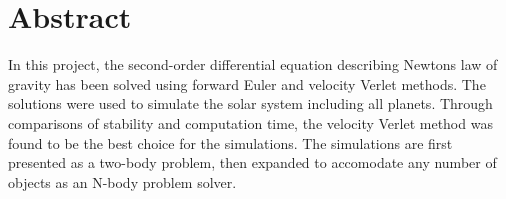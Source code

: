 \section{Abstract}
In this project, the second-order differential equation describing Newtons law of gravity has been
solved using forward Euler and velocity Verlet methods. The solutions were used to simulate the
solar system including all planets. Through comparisons of stability and computation time,
the velocity Verlet method was found to be the best choice for the simulations. The simulations are
first presented as a two-body problem, then expanded to accomodate any number of objects as an
N-body problem solver.
